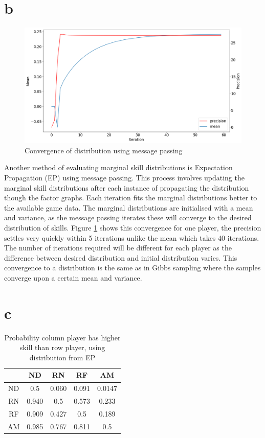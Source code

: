 \documentclass[twoside,twocolumn]{article}
\begin{document}
\section{b}
\begin{figure}[h]
  \centering
    \includegraphics[width=\linewidth]{b_1}
  \caption{Convergence of distribution using message passing}
  \label{fig:b_1}
\end{figure}

Another method of evaluating marginal skill distributions is Expectation Propagation (EP) using message passing. This process involves updating the marginal skill distributions after each instance of propagating the distribution though the factor graphs. Each iteration fits the marginal distributions better to the available game data. 
\newline
The marginal distributions are initialised with a mean and variance, as the message passing iterates these will converge to the desired distribution of skills. Figure \ref{fig:b_1} shows this convergence for one player, the precision settles very quickly within 5 iterations unlike the mean which takes 40 iterations. The number of iterations required will be different for each player as the difference between desired distribution and initial distribution varies. This convergence to a distribution is the same as in Gibbs sampling where the samples converge upon a certain mean and variance.
\section{c}
\begin{table}[h]
\centering
\begin{tabular}{ c | c  c  c  c}
&ND&RN&RF&AM\\ 

\midrule
ND&0.5  &    0.060 & 0.091 &0.0147\\
RN&0.940&0.5&0.573&0.233\\
RF&0.909&0.427&0.5&0.189 \\
AM&0.985&0.767&0.811&0.5\\
\end{tabular}
\caption{Probability column player has higher skill than row player, using distribution from EP}
\label{table:c1}
\end{table}
\end{document}
